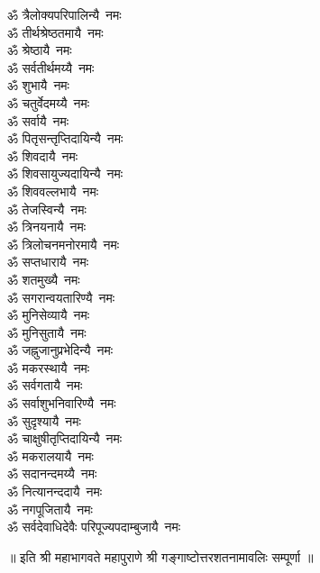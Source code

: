 \begin{multicols}{2}
\begin{flushleft}
ॐ त्रैलोक्यपरिपालिन्यै~नमः\\
ॐ तीर्थश्रेष्ठतमायै~नमः\hfill{}\\
ॐ श्रेष्ठायै~नमः\\
ॐ सर्वतीर्थमय्यै~नमः\\
ॐ शुभायै~नमः\\
ॐ चतुर्वेदमय्यै~नमः\\
ॐ सर्वायै~नमः\\
ॐ पितृसन्तृप्तिदायिन्यै~नमः\\
ॐ शिवदायै~नमः\\
ॐ शिवसायुज्यदायिन्यै~नमः\\
ॐ शिववल्लभायै~नमः\\
ॐ तेजस्विन्यै~नमः\hfill{}\\
ॐ त्रिनयनायै~नमः\\
ॐ त्रिलोचनमनोरमायै~नमः\\
ॐ सप्तधारायै~नमः\\
ॐ शतमुख्यै~नमः\\
ॐ सगरान्वयतारिण्यै~नमः\\
ॐ मुनिसेव्यायै~नमः\\
ॐ मुनिसुतायै~नमः\\
ॐ जह्नुजानुप्रभेदिन्यै~नमः\\
ॐ मकरस्थायै~नमः\\
ॐ सर्वगतायै~नमः\hfill{}\\
ॐ सर्वाशुभनिवारिण्यै~नमः\\
ॐ सुदृश्यायै~नमः\\
ॐ चाक्षुषीतृप्तिदायिन्यै~नमः\\
ॐ मकरालयायै~नमः\\
ॐ सदानन्दमय्यै~नमः\\
ॐ नित्यानन्ददायै~नमः\\
ॐ नगपूजितायै~नमः\\
ॐ सर्वदेवाधिदेवैः परिपूज्यपदाम्बुजायै~नमः\\
\end{flushleft}
\end{multicols}
\centerline{॥ इति श्री महाभागवते महापुराणे श्री गङ्गाष्टोत्तरशतनामावलिः सम्पूर्णा ॥}
